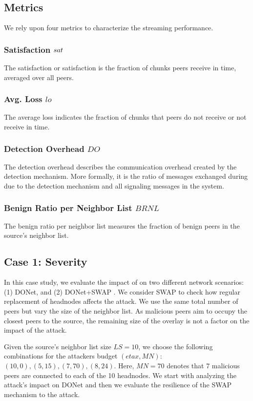 \subsection{Metrics}
We rely upon four metrics to characterize the streaming performance.

\subsubsection*{Satisfaction $sat$} The satisfaction or satisfaction is the fraction of chunks peers receive in time, averaged over all peers. 
\subsubsection*{Avg. Loss $lo$} The average loss indicates the fraction of chunks that peers do not receive or not receive in time. 
\subsubsection*{Detection Overhead $DO$} The detection overhead describes the communication overhead created by the detection mechanism. More formally, it is the ratio of messages exchanged during due to the detection mechanism and all signaling messages in the system.
\subsubsection*{Benign Ratio per Neighbor List $BRNL$} The benign ratio per neighbor list measures the fraction of benign peers in the source's neighbor list.

\subsection{Case 1: \drop Severity}

In this case study, we evaluate the impact of \drop on two different network scenarios:  (1) DONet, and (2) DONet+SWAP \cite{nguyen2016swap}. We consider SWAP to check  how regular replacement of headnodes affects the attack. 
We use the same total number of peers but vary the size of the neighbor list.
As malicious peers aim to occupy the closest peers to the source, the remaining size of the overlay is not a factor on the impact of the \drop attack.

Given the source's neighbor list size $LS=10$, we choose the following combinations for the attackers budget $(eta x, MN)$: $(10,0), (5,15), (7,70), (8,24)$.
Here, $MN=70$ denotes that 7 malicious peers are connected to each of the 10 headnodes.
We start with analyzing the attack's impact on DONet and then we evaluate the resilience of the SWAP mechanism to the attack.

